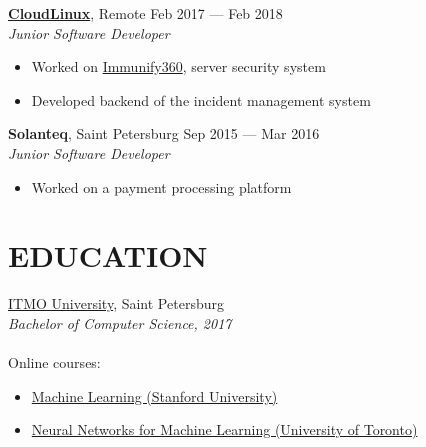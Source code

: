 \documentclass[margin]{cv}
\begin{document}
\begin{resume}
\href{https://www.cloudlinux.com}{\bf CloudLinux}, Remote \hfill Feb 2017 --- Feb 2018 \\
{\sl Junior Software Developer}
\begin{itemize}
    \itemsep-2pt
    \itemindent-10pt
    \item Worked on \href{https://www.imunify360.com}{Immunify360}, server security system
	\item Developed backend of the incident management system
\end{itemize}

{\bf Solanteq}, Saint Petersburg \hfill Sep 2015 --- Mar 2016 \\
{\sl Junior Software Developer}
\begin{itemize}
    \itemsep-2pt
    \itemindent-10pt
	\item Worked on a payment processing platform
\end{itemize}

\section{EDUCATION}
\href{https://en.itmo.ru}{ITMO University}, Saint Petersburg \\
{\sl Bachelor of Computer Science, 2017} \\\\
Online courses:
\begin{itemize}
    \itemsep-2pt
    \itemindent-10pt
    \item \href{https://www.coursera.org/account/accomplishments/verify/NAC3H6WDW9TL}{Machine Learning (Stanford University)}
    \item \href{https://www.coursera.org/account/accomplishments/verify/2LMELT5R6D25}{Neural Networks for Machine Learning (University of Toronto)}
\end{itemize}

\end{resume}
\end{document}
